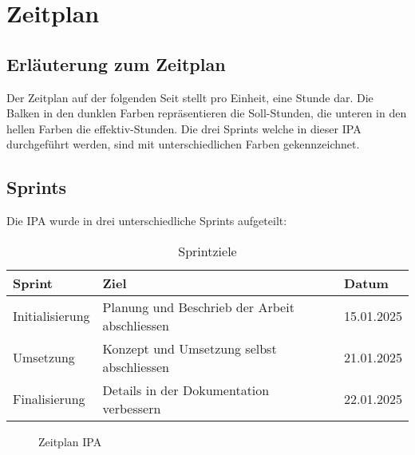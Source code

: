\chapter{Zeitplan}

\section{Erläuterung zum Zeitplan}
Der Zeitplan auf der folgenden Seit stellt pro Einheit, eine Stunde dar. Die Balken in den
dunklen Farben repräsentieren die Soll-Stunden, die unteren in den hellen Farben die effektiv-Stunden.
Die drei Sprints welche in dieser IPA durchgeführt werden, sind mit unterschiedlichen Farben gekennzeichnet.

\section{Sprints}
Die IPA wurde in drei unterschiedliche Sprints aufgeteilt: 

\begin{table}[h!]
  \begin{tabular}{|L{0.3\textwidth}|L{0.4\textwidth}|L{0.3\textwidth}|}
      \hline
       \color{white}\textbf{Sprint} & \color{white}\textbf{Ziel} & \color{white}\textbf{Datum} \\[12pt]
      \hline
      Initialisierung & Planung und Beschrieb der Arbeit abschliessen & 15.01.2025 \\
     \hline
     Umsetzung & Konzept und Umsetzung selbst abschliessen & 21.01.2025 \\
     \hline
     Finalisierung & Details in der Dokumentation verbessern & 22.01.2025 \\
     \hline
    \end{tabular}
    \caption{Sprintziele}
\end{table}

\newpage
\storeareas\zeitplan
{}
\areaset
  {\dimexpr\the\paperwidth-1cm\relax}%
  {\dimexpr\the\paperheight-5.5cm\relax}%
\recalctypearea

 \begin{figure}[htp] 
     \caption{Zeitplan IPA}
 \end{figure}

\restoregeometry
\zeitplan
\newpage

